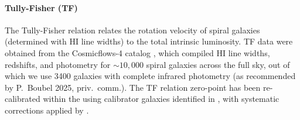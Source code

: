 \paragraph{Tully-Fisher (TF)\label{sec:data:TF}}
The Tully-Fisher relation relates the rotation velocity of spiral galaxies (determined with HI line widths) to the total intrinsic luminosity. TF data were obtained from the Cosmicflows-4 catalog \citep{2020ApJ...902..145K}, which compiled HI line widths, redshifts, and photometry for $\sim 10,000$ spiral galaxies across the full sky, out of which we use 3400 galaxies with complete infrared photometry (as recommended by P.~Boubel 2025, priv.\ comm.). The TF relation zero-point has been re-calibrated within the {\DN} using calibrator galaxies identified in \citet{2024MNRAS.533.1550B}, with systematic corrections applied by \citet{2024arXiv241208449S}.
